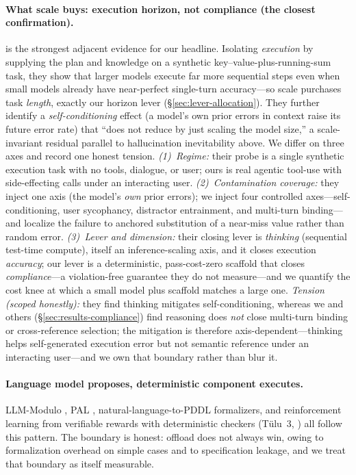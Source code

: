 \paragraph{What scale buys: execution horizon, not compliance (the closest confirmation).} \citet{ax2509_09677} is the strongest adjacent evidence for our headline. Isolating \emph{execution} by supplying the plan and knowledge on a synthetic key--value-plus-running-sum task, they show that larger models execute far more sequential steps even when small models already have near-perfect single-turn accuracy---so scale purchases task \emph{length}, exactly our horizon lever (\S\ref{sec:lever-allocation}). They further identify a \emph{self-conditioning} effect (a model's own prior errors in context raise its future error rate) that ``does not reduce by just scaling the model size,'' a scale-invariant residual parallel to hallucination inevitability above. We differ on three axes and record one honest tension. \emph{(1)~Regime:} their probe is a single synthetic execution task with no tools, dialogue, or user; ours is real agentic tool-use with side-effecting calls under an interacting user. \emph{(2)~Contamination coverage:} they inject one axis (the model's \emph{own} prior errors); we inject four controlled axes---self-conditioning, user sycophancy, distractor entrainment, and multi-turn binding---and localize the failure to anchored substitution of a near-miss value rather than random error. \emph{(3)~Lever and dimension:} their closing lever is \emph{thinking} (sequential test-time compute), itself an inference-scaling axis, and it closes execution \emph{accuracy}; our lever is a deterministic, pass-cost-zero scaffold that closes \emph{compliance}---a violation-free guarantee they do not measure---and we quantify the cost knee at which a small model plus scaffold matches a large one. \emph{Tension (scoped honestly):} they find thinking mitigates self-conditioning, whereas we and others (\S\ref{sec:results-compliance}) find reasoning does \emph{not} close multi-turn binding or cross-reference selection; the mitigation is therefore axis-dependent---thinking helps self-generated execution error but not semantic reference under an interacting user---and we own that boundary rather than blur it.

\paragraph{Language model proposes, deterministic component executes.} LLM-Modulo \citep{ax2402_01817}, PAL \citep{ax2211_10435}, natural-language-to-PDDL formalizers, and reinforcement learning from verifiable rewards with deterministic checkers (T\"ulu~3, \citealp{ax2411_15124}) all follow this pattern. The boundary is honest: offload does not always win, owing to formalization overhead on simple cases and to specification leakage, and we treat that boundary as itself measurable.

